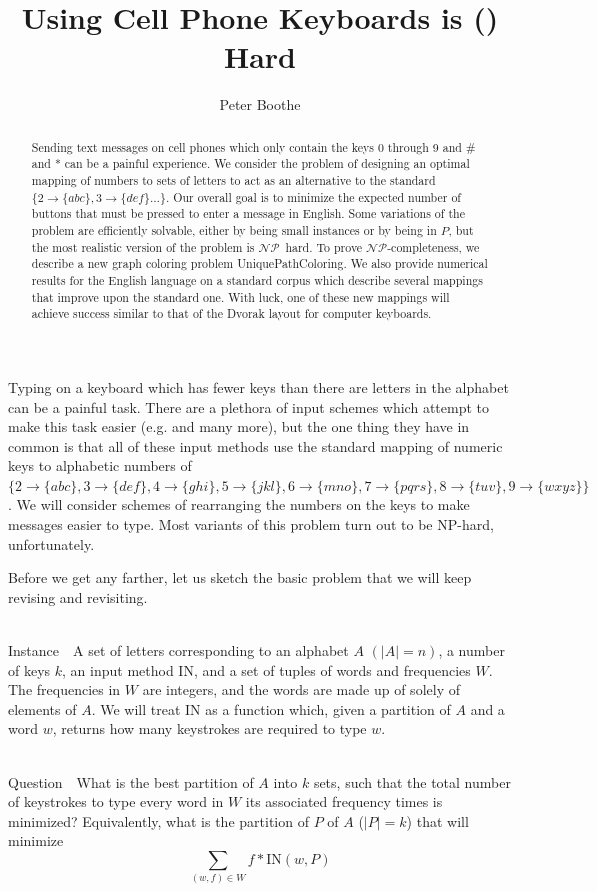 \documentclass[runningheads]{llncs}
\title{Using Cell Phone Keyboards is (\NP) Hard}
\author{Peter Boothe}
\institute{Manhattan College\\
\email{peter.boothe@manhattan.edu}
}
\newcommand{\NP}{\ensuremath{\mathcal{NP}}}
\newcommand{\Instance}{{\sc Instance~}}
\newcommand{\Question}{~\\
{\sc Question~}}
\begin{document}
\maketitle

\begin{abstract}
Sending text messages on cell phones which only contain the keys 0 through 9
and \# and * can be a painful experience.  We consider the problem of designing
an optimal mapping of numbers to sets of letters to act as an alternative to
the standard $\{2\to\{abc\}, 3\to\{def\}\ldots\}$.  Our overall goal is to
minimize the expected number of buttons that must be pressed to enter a message
in English.  Some variations of the problem are efficiently solvable, either by
being small instances or by being in \ensuremath{P}, but the most realistic
version of the problem is \NP\ hard.  To prove \NP-completeness, we describe a
new graph coloring problem {\sc UniquePathColoring}.  We also provide numerical
results for the English language on a standard corpus which describe several
mappings that improve upon the standard one.  With luck, one of these new
mappings will achieve success similar to that of the Dvorak layout for computer
keyboards.
\end{abstract}

Typing on a keyboard which has fewer keys than there are letters in the
alphabet can be a painful task.  There are a plethora of input schemes which
attempt to make this task easier (e.g. \cite{hcimethods,ordering1,godfest} and many more), but the one thing they have in common is
that all of these input methods use the standard mapping of numeric keys to
alphabetic numbers of 
$\{2\to\{abc\}, 3\to\{def\}, 4\to\{ghi\}, 5\to\{jkl\}, 6\to\{mno\}, 7\to\{pqrs\}, 8\to\{tuv\}, 9\to\{wxyz\}\}$.
We will consider schemes of rearranging the numbers on the keys to
make messages easier to type.  Most variants of this problem turn out to be
NP-hard, unfortunately.

Before we get any farther, let us sketch the basic problem that we will keep
revising and revisiting.  \begin{prob}[{\sc
MinimumKeystrokes}]~\\ \Instance\ A set of letters corresponding to an alphabet
$A$ $(|A| = n)$, a number of keys $k$, an input method $\mathrm{IN}$, and a set
of tuples of words and frequencies $W$.  The frequencies in $W$ are integers,
and the words are made up of solely of elements of $A$.  We will treat $\mathrm{IN}$ as
a function which, given a partition of $A$ and a word $w$, returns how many
keystrokes are required to type $w$.

\Question\ What is the best partition of $A$ into $k$ sets, such that the
total number of keystrokes to type every word in $W$ its associated frequency
times is minimized?  Equivalently, what is the partition of $P$ of $A$ ($|P| = k$) that
will minimize
$$\sum_{(w,f)\in W} f*\mathrm{IN}(w,P)$$
\label{probtemplate}
\end{prob}
\end{document}
